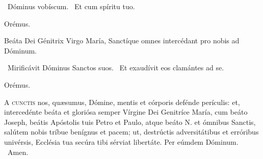 \V\ Dóminus vobíscum. \R\ Et cum spíritu tuo.

Orémus.





 Beáta Dei Génitrix Virgo María, Sanctíque omnes intercédant pro nobis ad Dóminum.

\V\ Mirificávit Dóminus Sanctos suos. \R\ Et exaudívit eos clamántes ad se.

Orémus. 

\lettrine[lines=2]{A}{} \textsc{cunctis} nos, quæsumus, Dómine, mentis et córporis defénde perículis: et, intercedénte beáta et gloriósa semper Vírgine Dei Genitríce María, cum beáto Joseph, beátis Apóstolis tuis Petro et Paulo, atque beáto N. et ómnibus Sanctis, salútem nobis tríbue benígnus et pacem; ut, destrúctis adversitátibus et erróribus univérsis, Ecclésia tua secúra tibi sérviat libertáte. Per eúmdem Dóminum. \R\ Amen.

